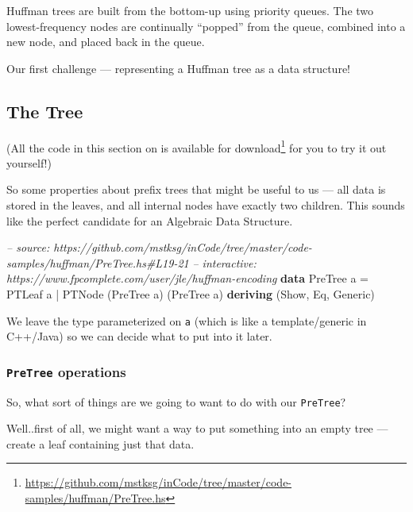 \documentclass[]{article}
\newenvironment{Shaded}{\begin{snugshade}}{\end{snugshade}}
\newcommand{\CommentTok}[1]{\textcolor[rgb]{0.56,0.35,0.01}{\textit{#1}}}
\newcommand{\DataTypeTok}[1]{\textcolor[rgb]{0.13,0.29,0.53}{#1}}
\newcommand{\FunctionTok}[1]{\textcolor[rgb]{0.00,0.00,0.00}{#1}}
\newcommand{\KeywordTok}[1]{\textcolor[rgb]{0.13,0.29,0.53}{\textbf{#1}}}
\newcommand{\NormalTok}[1]{#1}
\renewcommand{\href}[2]{#2\footnote{\url{#1}}}
\begin{document}
Huffman trees are built from the bottom-up using priority queues. The two
lowest-frequency nodes are continually ``popped'' from the queue, combined into
a new node, and placed back in the queue.

Our first challenge --- representing a Huffman tree as a data structure!

\hypertarget{the-tree}{%
\subsection{The Tree}\label{the-tree}}

(All the code in this section on is
\href{https://github.com/mstksg/inCode/tree/master/code-samples/huffman/PreTree.hs}{available
for download} for you to try it out yourself!)

So some properties about prefix trees that might be useful to us --- all data is
stored in the leaves, and all internal nodes have exactly two children. This
sounds like the perfect candidate for an Algebraic Data Structure.

\begin{Shaded}
\begin{Highlighting}[]
\CommentTok{-- source: https://github.com/mstksg/inCode/tree/master/code-samples/huffman/PreTree.hs#L19-21}
\CommentTok{-- interactive: https://www.fpcomplete.com/user/jle/huffman-encoding}
\KeywordTok{data} \DataTypeTok{PreTree}\NormalTok{ a }\FunctionTok{=} \DataTypeTok{PTLeaf}\NormalTok{ a}
               \FunctionTok{|} \DataTypeTok{PTNode}\NormalTok{ (}\DataTypeTok{PreTree}\NormalTok{ a) (}\DataTypeTok{PreTree}\NormalTok{ a)}
               \KeywordTok{deriving}\NormalTok{ (}\DataTypeTok{Show}\NormalTok{, }\DataTypeTok{Eq}\NormalTok{, }\DataTypeTok{Generic}\NormalTok{)}
\end{Highlighting}
\end{Shaded}

We leave the type parameterized on \texttt{a} (which is like a template/generic
in C++/Java) so we can decide what to put into it later.

\hypertarget{pretree-operations}{%
\subsubsection{\texorpdfstring{\texttt{PreTree}
operations}{PreTree operations}}\label{pretree-operations}}

So, what sort of things are we going to want to do with our \texttt{PreTree}?

Well..first of all, we might want a way to put something into an empty tree ---
create a leaf containing just that data.
\end{document}
